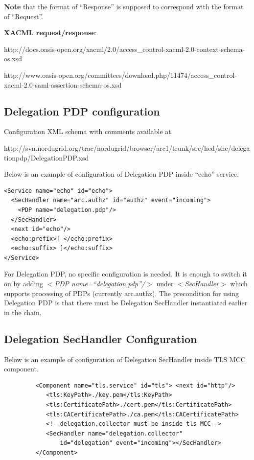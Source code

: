 \documentclass{article}                            %
\begin{document}
\textbf{Note} that the format of ``Response'' is supposed to correspond with the format of ``Request''.

\textbf{XACML request/response}:

http://docs.oasis-open.org/xacml/2.0/access\_control-xacml-2.0-context-schema-os.xsd

http://www.oasis-open.org/committees/download.php/11474/access\_control-xacml-2.0-saml-assertion-schema-os.xsd


\subsection{Delegation PDP configuration} %
\label{subsec:deleg_pdp_conf}
Configuration XML schema with comments available at

http://svn.nordugrid.org/trac/nordugrid/browser/arc1/trunk/src/hed/shc/delegationpdp/DelegationPDP.xsd

Below is an example of configuration of Delegation PDP inside ``echo'' service.

\begin{verbatim}
<Service name="echo" id="echo">
  <SecHandler name="arc.authz" id="authz" event="incoming">
    <PDP name="delegation.pdp"/>
  </SecHandler>
  <next id="echo"/>
  <echo:prefix>[ </echo:prefix>
  <echo:suffix> ]</echo:suffix>
</Service>
\end{verbatim}

For Delegation PDP, no specific configuration is needed. It is enough to switch it on by adding \textit{$<$PDP name=``delegation.pdp''/$>$} under \textit{$<$SecHandler$>$} which supports processing of PDPs (currently arc.authz).
The precondition for using Delegation PDP is that there must be Delegation SecHandler instantiated earlier in the chain.


\subsection{Delegation SecHandler Configuration} %
\label{subsec:deleg_sechandler_conf}
Below is an example of configuration of Delegation SecHandler inside TLS MCC component.

\begin{verbatim}
         <Component name="tls.service" id="tls"> <next id="http"/>
            <tls:KeyPath>./key.pem</tls:KeyPath>
            <tls:CertificatePath>./cert.pem</tls:CertificatePath>
            <tls:CACertificatePath>./ca.pem</tls:CACertificatePath>
            <!--delegation.collector must be inside tls MCC-->
            <SecHandler name="delegation.collector"
                id="delegation" event="incoming"></SecHandler>
         </Component>
\end{verbatim}
\end{document}
